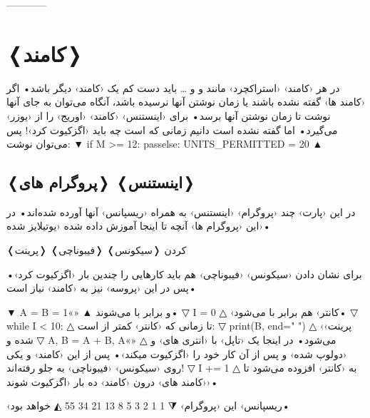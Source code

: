 \documentclass[openany, twocolumn]{book}
\begin{document}
------------

\section{❬کامند❭ }
در هر ‹کامند› ‹استراکچرد› مانند  و  و \ldots{} باید دست کم یک ‹کامند› دیگر باشد• اگر ‹کامند ها› گفته نشده باشند یا زمان نوشتن آنها نرسیده باشد، آنگاه می‌توان به جای آنها  نوشت تا زمان نوشتن آنها برسد• برای ‹اینستنس› ‹کامند›  ‹اوریج› را از ‹یوزر› می‌گیرد• اما گفته نشده است ‌دانیم زمانی که  است چه باید ‹اگزکیوت کرد›! پس می‌توان نوشت: 
▼
if M >= 12: 	passelse:	UNITS_PERMITTED = 20
▲
\begin{InlinePrograms}

\section{❬پروگرام های❭ ❬اینستنس❭}
در این ‹پارت› چند ‹پروگرام› ‹اینستنس› به همراه ‹ریسپانس› آنها آورده شده‌اند• در این ‹پروگرام ها› آنچه تا اینجا آموزش داده شده ‹یوتیلایز شده›•

\begin{Program}
\caption{❬پرینت❭ کردن ❬سیکونس❭ ❬فیبوناچی❭\label{R44}}

برای نشان دادن ‹سیکونس› ‹فیبوناچی› هم باید کار‌هایی را چندین بار ‹اگزکیوت کرد›• پس در این ‹پروسه› نیز به ‹کامند›  نیاز است•

▼
A = B = 1«\NewNoteMark»
▲
  و  برابر با  می‌شوند• 
▽
I = 0
△
 ‹کانتر›  هم برابر با  می‌شود• 
▽
while I < 10:
△
 تا زمانی که ‹کانتر›  کمتر از  است: 
▽
	print(B, end=" ")
△
  ‹پرینت› شده و 
▽
	A, B = A + B, A«\NewNoteMark»
△
 می‌شود• در اینجا یک ‹تاپل› با ‹انتری های›  و  ‹دولوپ شده› و پس از آن \code{=} کار خود را ‹اگزکیوت میکند›• پس از این ‹کامند›  و  یکی روی ‹سیکونس› ‹فیبوناچی› به جلو رفته‌اند! 
▽
	I += 1
△
 به ‹کانتر›  افزوده می‌شود تا ‹کامند های› درون ‹کامند›  ده بار ‹اگزکیوت شوند›• 

‹ریسپانس› این ‹پروگرام› 
⧨
1 1 2 3 5 8 13 21 34 55
◭
 خواهد بود•
\end{Program}


\end{InlinePrograms}
\end{document}
